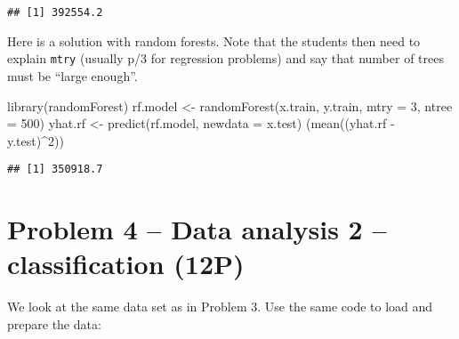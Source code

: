 \documentclass[
]{article}
\newenvironment{Shaded}{\begin{snugshade}}{\end{snugshade}}
\newcommand{\AttributeTok}[1]{\textcolor[rgb]{0.77,0.63,0.00}{#1}}
\newcommand{\CommentTok}[1]{\textcolor[rgb]{0.56,0.35,0.01}{\textit{#1}}}
\newcommand{\DecValTok}[1]{\textcolor[rgb]{0.00,0.00,0.81}{#1}}
\newcommand{\FunctionTok}[1]{\textcolor[rgb]{0.00,0.00,0.00}{#1}}
\newcommand{\NormalTok}[1]{#1}
\newcommand{\OtherTok}[1]{\textcolor[rgb]{0.56,0.35,0.01}{#1}}
\newcommand{\SpecialCharTok}[1]{\textcolor[rgb]{0.00,0.00,0.00}{#1}}
\begin{document}
\begin{verbatim}
## [1] 392554.2
\end{verbatim}

Here is a solution with random forests. Note that the students then need
to explain \texttt{mtry} (usually p/3 for regression problems) and say
that number of trees must be ``large enough''.

\begin{Shaded}
\begin{Highlighting}[]
\FunctionTok{library}\NormalTok{(randomForest)}
\NormalTok{rf.model }\OtherTok{\textless{}{-}} \FunctionTok{randomForest}\NormalTok{(x.train, y.train, }\AttributeTok{mtry =} \DecValTok{3}\NormalTok{, }\AttributeTok{ntree =} \DecValTok{500}\NormalTok{)}
\NormalTok{yhat.rf }\OtherTok{\textless{}{-}} \FunctionTok{predict}\NormalTok{(rf.model, }\AttributeTok{newdata =}\NormalTok{ x.test)}
\NormalTok{(}\FunctionTok{mean}\NormalTok{((yhat.rf }\SpecialCharTok{{-}}\NormalTok{ y.test)}\SpecialCharTok{\^{}}\DecValTok{2}\NormalTok{))}
\end{Highlighting}
\end{Shaded}

\begin{verbatim}
## [1] 350918.7
\end{verbatim}

\clearpage

\hypertarget{problem-4-data-analysis-2-classification-12p}{%
\section{Problem 4 -- Data analysis 2 -- classification
(12P)}\label{problem-4-data-analysis-2-classification-12p}}

We look at the same data set as in Problem 3. Use the same code to load
and prepare the data:

\begin{Shaded}
\end{Shaded}
\end{document}
